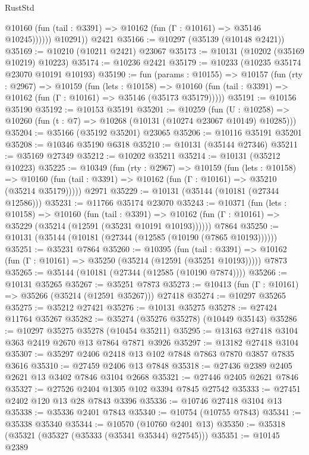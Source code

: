 \begin{lexlean}{RustStd}
\begin{coremodule}
              @10160 (fun (tail : @3391) => @10162 (fun (Γ : @10161) => @35146 @10245))))))
        @10291))
    @2421
@35166 := @10297 (@35139 (@10148 @2421))
@35169 := @10210 (@10211 @2421) @23067
@35173 := @10131 (@10202 (@35169 @10219) @10223)
@35174 := @10236 @2421
@35179 := @10233 (@10235 @35174 @23070 @10191 @10193)
@35190 := fun (params : @10155) =>
  @10157
    (fun (rty : @2967) =>
    @10159
      (fun (lets : @10158) =>
      @10160 (fun (tail : @3391) => @10162 (fun (Γ : @10161) => @35146 (@35173 @35179)))))
@35191 := @10156 @35190
@35192 := @10153 @35191
@35201 := @10259
    (fun (U : @10258) => @10260 (fun (t : @7) => @10268 (@10131 (@10274 @23067 @10149) @10285)))
@35204 := @35166 (@35192 @35201) @23065
@35206 := @10116 @35191 @35201
@35208 := @10346 @35190 @6318
@35210 := @10131 (@35144 @27346)
@35211 := @35169 @27349
@35212 := @10202 @35211
@35214 := @10131 (@35212 @10223)
@35225 := @10349
    (fun (rty : @2967) =>
    @10159
      (fun (lets : @10158) =>
      @10160 (fun (tail : @3391) => @10162 (fun (Γ : @10161) => @35210 (@35214 @35179)))))
    @2971
@35229 := @10131 (@35144 (@10181 (@27344 @12586)))
@35231 := @11766 @35174 @23070
@35243 := @10371
    (fun (lets : @10158) =>
    @10160
      (fun (tail : @3391) =>
      @10162 (fun (Γ : @10161) => @35229 (@35214 (@12591 (@35231 @10191 @10193))))))
    @7864
@35250 := @10131 (@35144 (@10181 (@27344 (@12585 (@10190 (@7865 @10193))))))
@35251 := @35231 @7864
@35260 := @10395
    (fun (tail : @3391) => @10162 (fun (Γ : @10161) => @35250 (@35214 (@12591 (@35251 @10193)))))
    @7873
@35265 := @35144 (@10181 (@27344 (@12585 (@10190 @7874))))
@35266 := @10131 @35265
@35267 := @35251 @7873
@35273 := @10413 (fun (Γ : @10161) => @35266 (@35214 (@12591 @35267))) @27418
@35274 := @10297 @35265
@35275 := @35212 @27421
@35276 := @10131 @35275
@35278 := @27424 @11764 @35267
@35282 := @35274 (@35276 @35278) (@10449 @35143)
@35286 := @10297 @35275 @35278 (@10454 @35211)
@35295 := @13163 @27418 @3104 @363 @2419 @2670 @13 @7864 @7871 @3926
@35297 := @13182 @27418 @3104
@35307 := @35297 @2406 @2418 @13 @102 @7848 @7863 @7870 @3857 @7835 @3616
@35310 := @27459 @2406 @13 @7848
@35318 := @27436 @2389 @2405 @2621 @13 @3402 @7846 @3104 @2668
@35321 := @27446 @2405 @2621 @7846
@35327 := @27526 @2404 @1305 @102 @3394 @7845 @27542
@35333 := @27451 @2402 @120 @13 @28 @7843 @3396
@35336 := @10746 @27418 @3104 @13
@35338 := @35336 @2401 @7843
@35340 := @10754 (@10755 @7843)
@35341 := @35338 @35340
@35344 := @10570 (@10760 @2401 @13)
@35350 := @35318 (@35321 (@35327 (@35333 (@35341 @35344) @27545)))
@35351 := @10145 @2389

\end{coremodule}
\end{lexlean}
